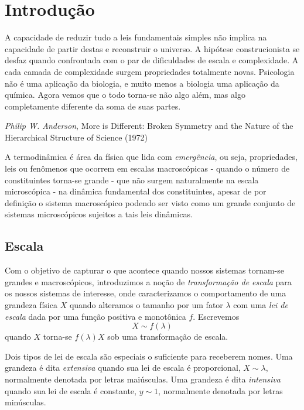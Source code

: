 \section{Introdução}

\epigraph{\justifying A capacidade de reduzir tudo a leis fundamentais simples
não implica na capacidade de partir destas e reconstruir o universo. A hipótese
construcionista se desfaz quando confrontada com o par de dificuldades de escala
e complexidade. A cada camada de complexidade surgem propriedades totalmente
novas. Psicologia não é uma aplicação da biologia, e muito menos a biologia uma
aplicação da química. Agora vemos que o todo torna-se não algo além, mas algo
completamente diferente da soma de suas partes.}{\emph{Philip W. Anderson}, More
is Different: Broken Symmetry and the Nature of the Hierarchical Structure of
Science (1972)}

\noindent A termodinâmica é área da física que lida com \emph{emergência}, ou
seja, propriedades, leis ou fenômenos que ocorrem em escalas macroscópicas -
quando o número de constituintes torna-se grande - que não surgem naturalmente
na escala microscópica - na dinâmica fundamental dos constituintes, apesar de
por definição o sistema macroscópico podendo ser visto como um grande conjunto
de sistemas microscópicos sujeitos a tais leis dinâmicas.

\subsection{Escala}

Com o objetivo de capturar o que acontece quando nossos sistemas tornam-se
grandes e macroscópicos, introduzimos a noção de \emph{transformação de escala}
para os nossos sistemas de interesse, onde caracterizamos o comportamento de uma
grandeza física $X$ quando alteramos o tamanho por um fator $\lambda$ com uma 
\emph{lei de escala} dada por uma função positiva e monotônica $f$. Escrevemos
$$X\sim f(\lambda)$$
quando $X$ torna-se $f(\lambda)X$ sob uma transformação de escala. 

Dois tipos de lei de escala são especiais o suficiente para receberem nomes. Uma
grandeza é dita \emph{extensiva} quando sua lei de escala é proporcional, $X\sim
\lambda$, normalmente denotada por letras maiúsculas. Uma grandeza é dita \emph{
intensiva} quando sua lei de escala é constante, $y\sim1$, normalmente denotada
por letras minúsculas.

